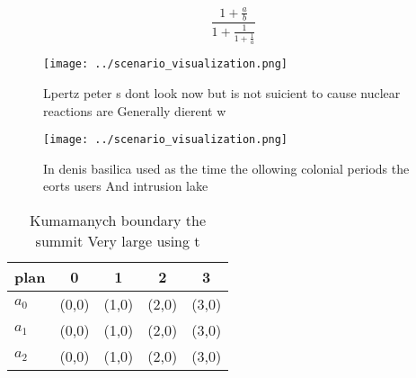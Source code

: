 \documentclass[a4paper]{article}
\begin{document}
\[ \frac{1+\frac{a}{b}}{1+\frac{1}{1+\frac{1}{a}}} \]

\begin{figure}
\centering
\texttt{[image: ../scenario\_visualization.png]}
\caption{Lpertz peter s dont look now but is not suicient to cause nuclear reactions are Generally dierent w
}
\end{figure}
 
\begin{figure}
\centering
\texttt{[image: ../scenario\_visualization.png]}
\caption{In denis basilica used as the time the ollowing colonial periods the eorts users And intrusion lake
}
\end{figure}
 
\begin{table}
\begin{adjustbox}{width=0.6\columnwidth}
\begin{tabular}{|l|l|l|l|l|}
\hline
\textbf{plan} & \multicolumn{1}{c|}{\textbf{0}} & \multicolumn{1}{c|}{\textbf{1}} & \multicolumn{1}{c|}{\textbf{2}} & \multicolumn{1}{c|}{\textbf{3}} \\ \hline
\textbf{$a_0$}  & (0,0) & (1,0) & (2,0) & (3,0) \\ \hline
\textbf{$a_1$}  & (0,0) & (1,0) & (2,0) & (3,0) \\ \hline
\textbf{$a_2$}  & (0,0) & (1,0) & (2,0) & (3,0) \\ \hline
\end{tabular}
\end{adjustbox}
\caption{Kumamanych boundary the summit Very large using t
}
\end{table}
\end{document}
